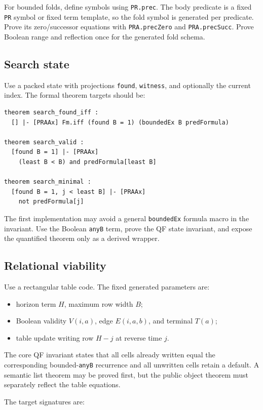 For bounded folds, define symbols using \texttt{PR.prec}.  The body predicate is a fixed \texttt{PR} symbol or fixed term template, so the fold symbol is generated per predicate.  Prove its zero/successor equations with \texttt{PRA.precZero} and \texttt{PRA.precSucc}.  Prove Boolean range and reflection once for the generated fold schema.

\subsection{Search state}

Use a packed state with projections \texttt{found}, \texttt{witness}, and optionally the current index.  The formal theorem targets should be:

\begin{lstlisting}
theorem search_found_iff :
  [] |- [PRAAx] Fm.iff (found B = 1) (boundedEx B predFormula)

theorem search_valid :
  [found B = 1] |- [PRAAx]
    (least B < B) and predFormula[least B]

theorem search_minimal :
  [found B = 1, j < least B] |- [PRAAx]
    not predFormula[j]
\end{lstlisting}
The first implementation may avoid a general \texttt{boundedEx} formula macro in the invariant.  Use the Boolean \texttt{anyB} term, prove the QF state invariant, and expose the quantified theorem only as a derived wrapper.

\subsection{Relational viability}

Use a rectangular table code.  The fixed generated parameters are:
\begin{itemize}
  \item horizon term \(H\), maximum row width \(B\);
  \item Boolean validity \(V(i,a)\), edge \(E(i,a,b)\), and terminal \(T(a)\);
  \item table update writing row \(H-j\) at reverse time \(j\).
\end{itemize}
The core QF invariant states that all cells already written equal the corresponding bounded-\texttt{anyB} recurrence and all unwritten cells retain a default.  A semantic list theorem may be proved first, but the public object theorem must separately reflect the table equations.

The target signatures are:

